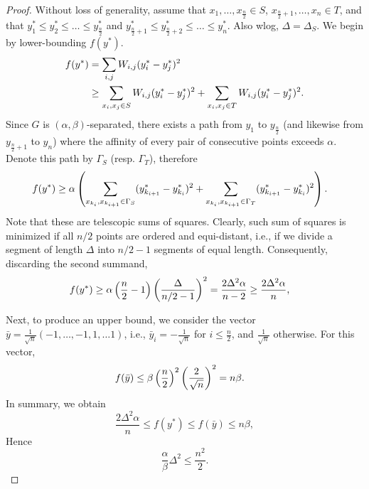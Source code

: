 \documentclass{article} %
\begin{document}
\begin{proof}
Without loss of generality, assume that $x_1,\ldots,x_\frac{n}{2}\in S$, $x_{\frac{n}{2}+1},\ldots,x_{n}\in T$, and that $y^*_1\le y^*_2 \le \ldots \le y^*_\frac{n}{2}$ and $y^*_{\frac{n}{2}+1}\le y^*_{\frac{n}{2}+2} \le \ldots \le y^*_n$. Also wlog, $\Delta=\Delta_S$.
We begin by lower-bounding $f(y^*)$.
\begin{align}
f(y^*) &= \sum_{i,j} W_{i,j}(y^*_i-y^*_j)^2 \notag\\
&\ge \sum_{x_i,x_j \in S} W_{i,j}(y^*_i-y^*_j)^2 + \sum_{x_i,x_j \in T} W_{i,j}(y^*_i-y^*_j)^2. \notag
\end{align}
Since $G$ is $(\alpha,\beta)$-separated, there exists a path from $y_1$ to $y_{\frac{n}{2}}$ (and likewise from $y_{\frac{n}{2}+1}$ to $y_n$) where the affinity of every pair of consecutive points exceeds $\alpha$. Denote this path by $\Gamma_S$ (resp. $\Gamma_T$), therefore
\begin{align}
f(y^*) &\ge \alpha \left(\sum_{x_{k_i},x_{k_{i+1}} \in \Gamma_S}(y^*_{k_{i+1}}-y^*_{k_i})^2 + \sum_{x_{k_i},x_{k_{i+1}} \in \Gamma_T}(y^*_{k_{i+1}}-y^*_{k_i})^2\right)\notag.
\end{align}
Note that these are telescopic sums of squares. Clearly, such sum of squares is minimized if all $n/2$ points are ordered and equi-distant, i.e., if we divide a segment of length $\Delta$ into $n/2-1$ segments of equal length. Consequently, discarding the second summand,
\begin{align}
f(y^*) &\ge  \alpha \left(\frac{n}{2}-1\right)\left(\frac{\Delta}{n/2-1}\right)^2
=  \frac{2\Delta^2 \alpha}{n-2}
\ge \frac{2\Delta^2 \alpha}{n},\notag
\end{align}

Next, to produce an upper bound, we consider the vector $\bar{y} = \frac{1}{\sqrt{n}}(-1,\ldots,-1,1,\ldots 1)$, i.e., $\bar{y}_i=-\frac{1}{\sqrt{n}}$ for $i\le\frac{n}{2}$, and $\frac{1}{\sqrt{n}}$ otherwise. For this vector,
\begin{align}
f(\bar{y}) &\le \beta \left(\frac{n}{2}\right)^2 \left(\frac{2}{\sqrt{n}}\right)^2
=n\beta.\notag
\end{align}
In summary, we obtain
$$ \frac{2\Delta^2 \alpha}{n} \le f(y^*) \le f(\bar{y}) \le n\beta,$$
Hence
$$\frac{\alpha}{\beta}\Delta^2 \le \frac{n^2}{2}.$$
\end{proof}
\end{document}
